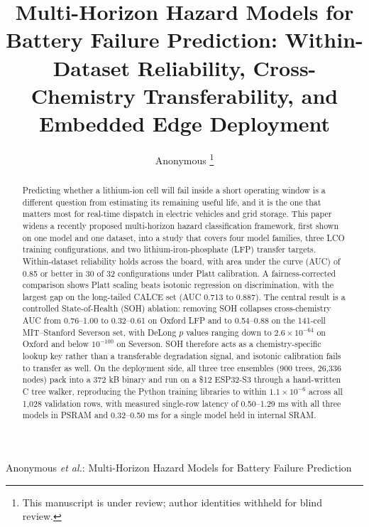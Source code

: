 \documentclass[journal]{IEEEtran}
\begin{document}
\title{Multi-Horizon Hazard Models for Battery Failure Prediction: Within-Dataset Reliability, Cross-Chemistry Transferability, and Embedded Edge Deployment}

\author{Anonymous%
\thanks{This manuscript is under review; author identities withheld for blind review.}}

%
{Anonymous \MakeLowercase{\textit{et al.}}: Multi-Horizon Hazard Models for Battery Failure Prediction}

\maketitle

\begin{abstract}
Predicting whether a lithium-ion cell will fail inside a short operating window is a different question from estimating its remaining useful life, and it is the one that matters most for real-time dispatch in electric vehicles and grid storage. This paper widens a recently proposed multi-horizon hazard classification framework, first shown on one model and one dataset, into a study that covers four model families, three LCO training configurations, and two lithium-iron-phosphate (LFP) transfer targets. Within-dataset reliability holds across the board, with area under the curve (AUC) of 0.85 or better in 30 of 32 configurations under Platt calibration. A fairness-corrected comparison shows Platt scaling beats isotonic regression on discrimination, with the largest gap on the long-tailed CALCE set (AUC 0.713 to 0.887). The central result is a controlled State-of-Health (SOH) ablation: removing SOH collapses cross-chemistry AUC from 0.76--1.00 to 0.32--0.61 on Oxford LFP and to 0.54--0.88 on the 141-cell MIT--Stanford Severson set, with DeLong $p$ values ranging down to $2.6\times10^{-64}$ on Oxford and below $10^{-100}$ on Severson. SOH therefore acts as a chemistry-specific lookup key rather than a transferable degradation signal, and isotonic calibration fails to transfer as well. On the deployment side, all three tree ensembles (900 trees, 26,336 nodes) pack into a 372 kB binary and run on a \$12 ESP32-S3 through a hand-written C tree walker, reproducing the Python training libraries to within $1.1\times10^{-6}$ across all 1,028 validation rows, with measured single-row latency of 0.50--1.29 ms with all three models in PSRAM and 0.32--0.50 ms for a single model held in internal SRAM.
\end{abstract}
\end{document}
